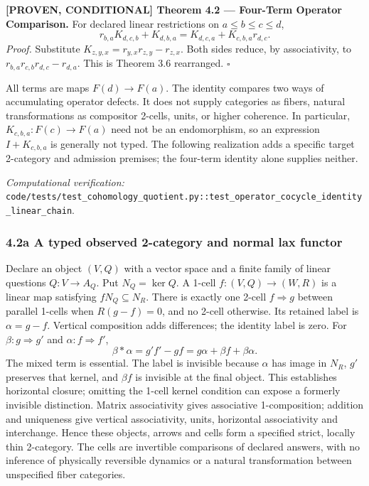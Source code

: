 \documentclass[
  english,
  10pt,
  a4paper,
]{article}
\renewenvironment{quote}
  {\begin{leftbar}\small}
  {\end{leftbar}}
\begin{document}
\begin{quote}
\textbf{{[}PROVEN, CONDITIONAL{]} Theorem 4.2 --- Four-Term Operator
Comparison.} For declared linear restrictions on \(a\le b\le c\le d\),
\[
r_{b,a}K_{d,c,b}+K_{d,b,a}
=K_{d,c,a}+K_{c,b,a}r_{d,c}.
\] \emph{Proof.} Substitute \(K_{z,y,x}=r_{y,x}r_{z,y}-r_{z,x}\). Both
sides reduce, by associativity, to \(r_{b,a}r_{c,b}r_{d,c}-r_{d,a}\).
This is Theorem 3.6 rearranged. \(\square\)
\end{quote}

All terms are maps \(F(d)\to F(a)\). The identity compares two ways of
accumulating operator defects. It does not supply categories as fibers,
natural transformations as compositor 2-cells, units, or higher
coherence. In particular, \(K_{c,b,a}:F(c)\to F(a)\) need not be an
endomorphism, so an expression \(I+K_{c,b,a}\) is generally not typed.
The following realization adds a specific target 2-category and
admission premises; the four-term identity alone supplies neither.

\emph{Computational verification:}
\nolinkurl{code/tests/test_cohomology_quotient.py::test_operator_cocycle_identity_linear_chain}.

\subsubsection{4.2a A typed observed 2-category and normal lax
functor}\label{a-a-typed-observed-2-category-and-normal-lax-functor}

Declare an object \((V,Q)\) with a vector space and a finite family of
linear questions \(Q:V\to A_Q\). Put \(N_Q=\ker Q\). A 1-cell
\(f:(V,Q)\to(W,R)\) is a linear map satisfying \(fN_Q\subseteq N_R\).
There is exactly one 2-cell \(f\Rightarrow g\) between parallel 1-cells
when \(R(g-f)=0\), and no 2-cell otherwise. Its retained label is
\(\alpha=g-f\). Vertical composition adds differences; the identity
label is zero. For \(\beta:g\Rightarrow g'\) and
\(\alpha:f\Rightarrow f'\), \[
\beta*\alpha=g'f'-gf=g\alpha+\beta f+\beta\alpha.
\] The mixed term is essential. The label is invisible because
\(\alpha\) has image in \(N_R\), \(g'\) preserves that kernel, and
\(\beta f\) is invisible at the final object. This establishes
horizontal closure; omitting the 1-cell kernel condition can expose a
formerly invisible distinction. Matrix associativity gives associative
1-composition; addition and uniqueness give vertical associativity,
units, horizontal associativity and interchange. Hence these objects,
arrows and cells form a specified strict, locally thin 2-category. The
cells are invertible comparisons of declared answers, with no inference
of physically reversible dynamics or a natural transformation between
unspecified fiber categories.
\end{document}
